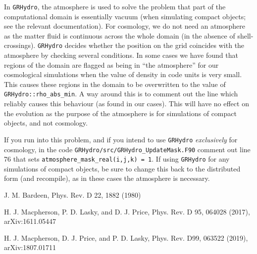 In {\tt GRHydro}, the atmosphere is used to solve the problem that part of the computational domain is essentially vacuum (when simulating compact objects; see the relevant documentation). For cosmology, we do not need an atmosphere as the matter fluid is continuous across the whole domain (in the absence of shell-crossings). {\tt GRHydro} decides whether the position on the grid coincides with the atmosphere by checking several conditions. In some cases we have found that regions of the domain are flagged as being in ``the atmosphere'' for our cosmological simulations when the value of density in code units is very small. This causes these regions in the domain to be overwritten to the value of {\tt GRHydro::rho\_abs\_min}. A way around this is to comment out the line which reliably causes this behaviour (as found in our cases). This will have no effect on the evolution as the purpose of the atmosphere is for simulations of compact objects, and not cosmology. 

If you run into this problem, and if you intend to use {\tt GRHydro} \textit{exclusively} for cosmology, in the code {\tt GRHydro/src/GRHydro\_UpdateMask.F90} comment out line 76 that sets {\tt atmosphere\_mask\_real(i,j,k) = 1}. If using {\tt GRHydro} for any simulations of compact objects, be sure to change this back to the distributed form (and recompile), as in these cases the atmosphere is necessary. 



\begin{thebibliography}{9}

 J. M. Bardeen, Phys. Rev. D 22, 1882 (1980)

 H. J. Macpherson, P. D. Lasky, and D. J. Price, Phys. Rev. D 95, 064028 (2017), arXiv:1611.05447

 H. J. Macpherson, D. J. Price, and P. D. Lasky, Phys. Rev. D99, 063522 (2019), arXiv:1807.01711

\end{thebibliography}









